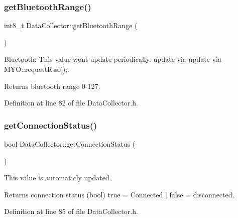 \subsubsection{\texorpdfstring{get\+Bluetooth\+Range()}{getBluetoothRange()}}
{\footnotesize\ttfamily int8\+\_\+t Data\+Collector\+::get\+Bluetooth\+Range (\begin{DoxyParamCaption}{ }\end{DoxyParamCaption})\hspace{0.3cm}{\ttfamily [inline]}}



Bluetooth\+: This value wont update periodically. update via update via M\+Y\+O\+::request\+Rssi();. 

\begin{DoxyReturn}{Returns}
bluetooth range 0-\/127. 
\end{DoxyReturn}


Definition at line 82 of file Data\+Collector.\+h.

\mbox{\label{class_data_collector_a2dbac95176fb77c1714573e41ba4490f}} 
\subsubsection{\texorpdfstring{get\+Connection\+Status()}{getConnectionStatus()}}
{\footnotesize\ttfamily bool Data\+Collector\+::get\+Connection\+Status (\begin{DoxyParamCaption}{ }\end{DoxyParamCaption})\hspace{0.3cm}{\ttfamily [inline]}}



This value is automaticly updated. 

\begin{DoxyReturn}{Returns}
connection status (bool) true = Connected $\vert$ false = disconnected. 
\end{DoxyReturn}


Definition at line 85 of file Data\+Collector.\+h.

\mbox{\label{class_data_collector_a6994bc51d1e7cbcaeca954a4ba7f8103}} 
